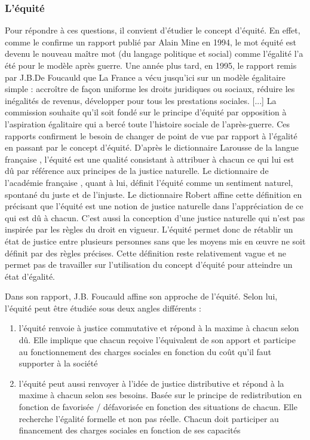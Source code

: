 \subsubsection{L'équité}
Pour répondre à ces questions, il convient d'étudier le concept d'équité. En effet, comme le confirme un rapport publié par Alain Mine \cite{MineRapport1994} en 1994, le mot \og équité\fg{} est devenu \og le nouveau maître mot (du langage politique et social) comme l'égalité l'a été pour le modèle après guerre\fg{}. Une année plus tard, en 1995, le rapport remis par J.B.De Foucauld \cite{Foucauld1995} que \og La France a vécu jusqu'ici sur un modèle égalitaire simple : accroître de façon uniforme les droits juridiques ou sociaux, réduire les inégalités de revenus, développer pour tous les prestations sociales. [...] La commission souhaite qu'il soit fondé sur le principe d'équité par opposition à l'aspiration égalitaire qui a bercé toute l'histoire sociale de l'après-guerre\fg{}. Ces rapports confirment le besoin de changer de point de vue par rapport à l'égalité en passant par le concept d'équité. D'après le dictionnaire Larousse de la langue française \cite{DictionnaireLarousse}, l'équité est \og une qualité consistant à attribuer à chacun ce qui lui est dû par référence aux principes de la justice naturelle\fg{}. Le dictionnaire de l'académie française \cite{DictionnaireAcademieFrancaise}, quant à lui, définit l'équité comme \og un sentiment naturel, spontané du juste et de l'injuste\fg{}. Le dictionnaire Robert \cite{DictionnaireRobert} affine cette définition en précisant que l'équité est une notion de justice naturelle dans l'appréciation de ce qui est dû à chacun. C'est aussi la conception d'une justice naturelle qui n'est pas inspirée par les règles du droit en vigueur. L'équité permet donc de rétablir un état de justice entre plusieurs personnes sans que les moyens mis en \oe{}uvre ne soit définit par des règles précises. Cette définition reste relativement vague et ne permet pas de travailler sur l'utilisation du concept d'équité pour atteindre un état d'égalité. 


Dans son rapport, J.B. Foucauld \cite{Foucauld1995} affine son approche de l'équité. Selon lui, l'équité peut être étudiée sous deux angles différents : 
\begin{enumerate}
\item l'équité renvoie à justice commutative et répond à la maxime \og à chacun selon dû\fg{}. Elle implique que chacun reçoive l'équivalent de son apport et participe au fonctionnement des charges sociales en fonction du coût qu'il faut supporter à la société
\item l'équité peut aussi renvoyer à l'idée de justice distributive et répond à la maxime \og à chacun selon ses besoins\fg{}. Basée sur le principe de redistribution en fonction de favorisée / défavorisée en fonction des situations de chacun. Elle recherche l'égalité formelle et non pas réelle. Chacun doit participer au financement des charges sociales en fonction de ses capacités
\end{enumerate}

